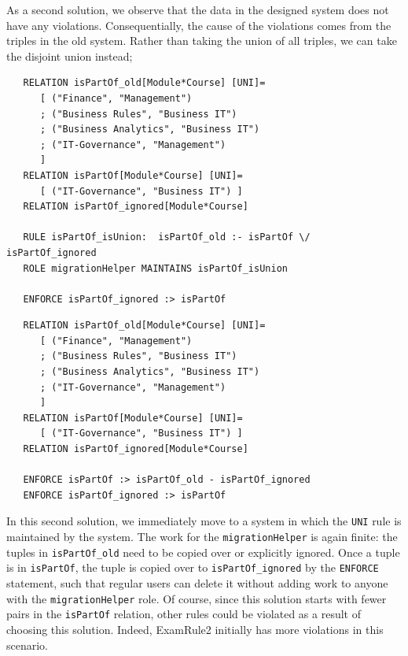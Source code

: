 \documentclass{elsarticle}
\begin{document}
As a second solution, we observe that the data in the designed system does not have any violations.
Consequentially, the cause of the violations comes from the triples in the old system.
Rather than taking the union of all triples, we can take the disjoint union instead;
\begin{verbatim}
   RELATION isPartOf_old[Module*Course] [UNI]=
      [ ("Finance", "Management")
      ; ("Business Rules", "Business IT")
      ; ("Business Analytics", "Business IT")
      ; ("IT-Governance", "Management")
      ]
   RELATION isPartOf[Module*Course] [UNI]=
      [ ("IT-Governance", "Business IT") ]
   RELATION isPartOf_ignored[Module*Course]
   
   RULE isPartOf_isUnion:  isPartOf_old :- isPartOf \/ isPartOf_ignored
   ROLE migrationHelper MAINTAINS isPartOf_isUnion
   
   ENFORCE isPartOf_ignored :> isPartOf
\end{verbatim}

\begin{verbatim}
   RELATION isPartOf_old[Module*Course] [UNI]=
      [ ("Finance", "Management")
      ; ("Business Rules", "Business IT")
      ; ("Business Analytics", "Business IT")
      ; ("IT-Governance", "Management")
      ]
   RELATION isPartOf[Module*Course] [UNI]=
      [ ("IT-Governance", "Business IT") ]
   RELATION isPartOf_ignored[Module*Course]

   ENFORCE isPartOf :> isPartOf_old - isPartOf_ignored
   ENFORCE isPartOf_ignored :> isPartOf
\end{verbatim}
In this second solution, we immediately move to a system in which the \verb=UNI= rule is maintained by the system.
The work for the \verb=migrationHelper= is again finite: the tuples in \verb=isPartOf_old= need to be copied over or explicitly ignored.
Once a tuple is in \verb=isPartOf=, the tuple is copied over to \verb=isPartOf_ignored= by the \verb=ENFORCE= statement, such that regular users can delete it without adding work to anyone with the \verb=migrationHelper= role.
Of course, since this solution starts with fewer pairs in the \verb=isPartOf= relation, other rules could be violated as a result of choosing this solution.
Indeed, ExamRule2 initially has more violations in this scenario.
\end{document}
